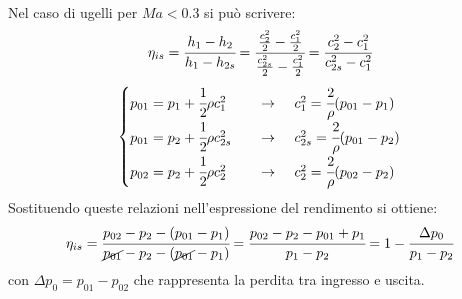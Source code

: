\\Nel caso di ugelli per $Ma < 0.3$ si può scrivere:
\begin{align*}
\eta_{is} = \cfrac{h_{1} - h_2}{h_1-h_{2s}} =\cfrac{\frac{c_2^2}{2}-\frac{c_1^2}{2}}{\frac{c_{2s}^2}{2}-\frac{c_1^2}{2}} = \cfrac{c_2^2 - c_1^2}{c_{2s}^2 - c_1^2}
\end{align*}
\begin{align*}
\begin{cases}
p_{01} = p_1 + \cfrac{1}{2} \rho c_1^2 \;\;\;\;& \to  \;\;\;\; c_1^2 = \cfrac{2}{\rho} (p_{01} - p_1)\\
p_{01} = p_2 + \cfrac{1}{2} \rho c_{2s}^2 \;\;\;\;& \to  \;\;\;\; c_{2s}^2 = \cfrac{2}{\rho} (p_{01} - p_2)\\
p_{02} = p_2 + \cfrac{1}{2} \rho c_2^2 \;\;\;\;& \to  \;\;\;\; c_2^2 = \cfrac{2}{\rho} (p_{02} - p_2)
\end{cases}
\end{align*}
Sostituendo queste relazioni nell'espressione del rendimento si ottiene:
\begin{align*}
\eta_{is} = \cfrac{p_{02} - p_2 - (p_{01} - p_1)}{\cancel{p_{01}} - p_2 - (\cancel{p_{01}} - p_1)}=\cfrac{p_{02} - p_2 -p_{01} + p_1}{p_1-p_2}=1- \cfrac{\Delta p_0}{p_1 - p_2}
\end{align*}
con $\Delta p_0=p_{01}-p_{02}$ che rappresenta la perdita tra ingresso e uscita.

